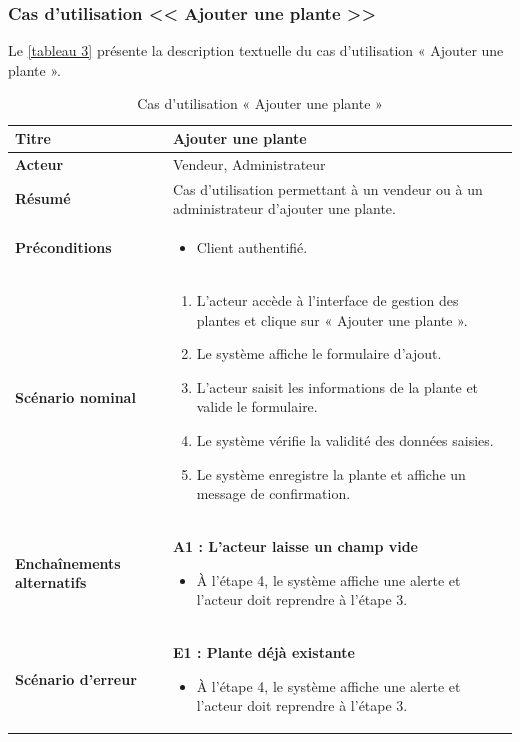 \subsubsection{Cas d'utilisation << Ajouter une plante >>}

Le \autoref{tableau 3} présente la description textuelle du cas d'utilisation « Ajouter une plante ».

\begin{table}[H]
\centering
\renewcommand{\arraystretch}{1.4}
\begin{tabular}{|p{4cm}|p{10cm}|}
\hline
\textbf{Titre} & Ajouter une plante \\
\hline
\textbf{Acteur} & Vendeur, Administrateur \\
\hline
\textbf{Résumé} & Cas d'utilisation permettant à un vendeur ou à un administrateur d'ajouter une plante. \\
\hline
\textbf{Préconditions} &
\vspace{-12pt}
\begin{itemize}
    \item Client authentifié.
\end{itemize} \\
\hline
\textbf{Scénario nominal} &
\vspace{-12pt}
\begin{enumerate}
    \item L'acteur accède à l'interface de gestion des plantes et clique sur « Ajouter une plante ».
    \item Le système affiche le formulaire d'ajout.
    \item L'acteur saisit les informations de la plante et valide le formulaire.
    \item Le système vérifie la validité des données saisies.
    \item Le système enregistre la plante et affiche un message de confirmation.
\end{enumerate} \\
\hline
\textbf{Enchaînements alternatifs} &
\vspace{-12pt}
\textbf{A1 : L'acteur laisse un champ vide}
\begin{itemize}
    \item À l'étape 4, le système affiche une alerte et l'acteur doit reprendre à l'étape 3.
\end{itemize} \\
\hline
\textbf{Scénario d'erreur} &
\vspace{-12pt}
\textbf{E1 : Plante déjà existante}
\begin{itemize}
    \item À l'étape 4, le système affiche une alerte et l'acteur doit reprendre à l'étape 3.
\end{itemize} \\
\hline
\end{tabular}
\caption{Cas d'utilisation « Ajouter une plante »}
\label{tableau 3}
\end{table}

